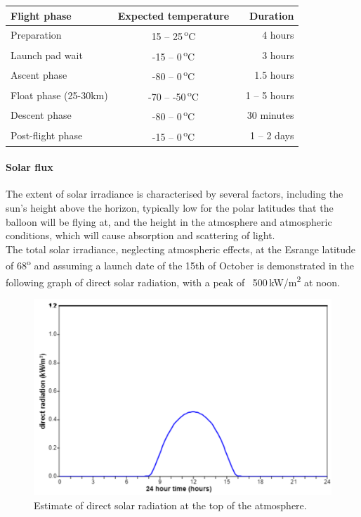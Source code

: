 \begin{center}
  \begin{tabular}{ | l | c | r | }
    \hline
    \textbf{Flight phase} & \textbf{Expected temperature} & \textbf{Duration} \\ \hline
    Preparation  & 15 – 25\,\textsuperscript{o}C & 4 hours \\ \hline
    Launch pad wait & -15 – 0\,\textsuperscript{o}C & 3 hours \\ \hline
    Ascent phase  & -80 – 0\,\textsuperscript{o}C & 1.5 hours \\ \hline
    Float phase (25-30km) & -70 – -50\,\textsuperscript{o}C & 1 – 5 hours \\ \hline
    Descent phase  & -80 – 0\,\textsuperscript{o}C & ~ 30 minutes \\ \hline
    Post-flight phase & -15 – 0\,\textsuperscript{o}C & 1 – 2 days \\ \hline
  \end{tabular}
\end{center}

\paragraph{Solar flux}

The extent of solar irradiance is characterised by several factors, including the sun’s height above the horizon, typically low for the polar latitudes that the balloon will be flying at, and the height in the atmosphere and atmospheric conditions, which will cause absorption and scattering of light. \\
The total solar irradiance, neglecting atmospheric effects, at the Esrange latitude of 68\textsuperscript{o} and assuming a launch date of the 15th of October is demonstrated in the following graph of direct solar radiation, with a peak of ~500\,kW/m\textsuperscript{2} at noon.\\

	\begin{figure}[h!]
    \centering
    \includegraphics[scale=0.6]{4-experiment-design/img/mechanical/directradiation.png}
	\caption{Estimate of direct solar radiation at the top of the atmosphere.}
	\label{fig:directradiation}
	\end{figure}

